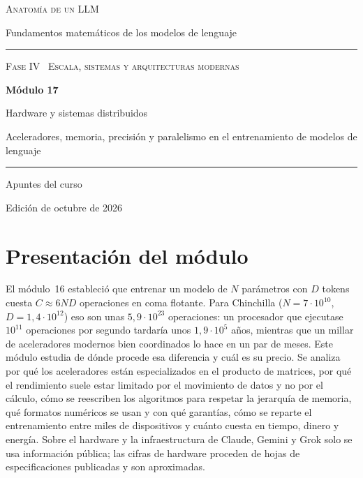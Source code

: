 \documentclass[11pt,a4paper,twoside,openany]{book}
\begin{document}
\frontmatter
\begin{titlepage}
\centering
\vspace*{2.5cm}
{\large\scshape Anatomía de un LLM}\par
\vspace{0.4cm}
{\normalsize Fundamentos matemáticos de los modelos de lenguaje}\par
\vspace{2.2cm}
\rule{\textwidth}{0.8pt}\par\vspace{0.5cm}
{\small\scshape Fase IV \textperiodcentered\ Escala, sistemas y arquitecturas modernas}\par\vspace{0.3cm}
{\Huge\bfseries Módulo 17\par}\vspace{0.3cm}
{\LARGE Hardware y sistemas distribuidos\par}
\vspace{0.2cm}
{\large Aceleradores, memoria, precisión y paralelismo en el entrenamiento de modelos de lenguaje\par}
\vspace{0.5cm}\rule{\textwidth}{0.4pt}\par
\vspace{1.6cm}
{\large Apuntes del curso}\par
\vfill
{\small Edición de octubre de 2026}\par
\end{titlepage}

\chapter*{Presentación del módulo}

El módulo~16 estableció que entrenar un modelo de $N$ parámetros con $D$ tokens cuesta $C\approx 6ND$ operaciones en coma flotante. Para Chinchilla ($N=7\cdot 10^{10}$, $D=1{,}4\cdot 10^{12}$) eso son unas $5{,}9\cdot 10^{23}$ operaciones: un procesador que ejecutase $10^{11}$ operaciones por segundo tardaría unos $1{,}9\cdot 10^{5}$ años, mientras que un millar de aceleradores modernos bien coordinados lo hace en un par de meses. Este módulo estudia de dónde procede esa diferencia y cuál es su precio. Se analiza por qué los aceleradores están especializados en el producto de matrices, por qué el rendimiento suele estar limitado por el movimiento de datos y no por el cálculo, cómo se reescriben los algoritmos para respetar la jerarquía de memoria, qué formatos numéricos se usan y con qué garantías, cómo se reparte el entrenamiento entre miles de dispositivos y cuánto cuesta en tiempo, dinero y energía. Sobre el hardware y la infraestructura de Claude, Gemini y Grok solo se usa información pública; las cifras de hardware proceden de hojas de especificaciones publicadas y son aproximadas.
\end{document}
